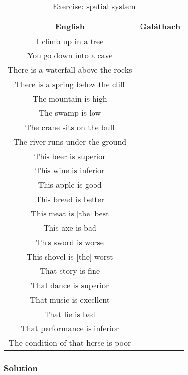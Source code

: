 \begin{table}[H]
\centering
\begin{tabular}{|c|M{5.0cm}|}
  \toprule
  \textbf{English} & \textbf{Gal\'{a}thach}\\
  \toprule
  I climb up in a tree & \\
  \midrule
  You go down into a cave & \\
  \midrule
  There is a waterfall above the rocks & \\
  \midrule
  There is a spring below the cliff & \\
  \midrule
  The mountain is high & \\
  \midrule
  The swamp is low & \\
  \midrule
  The crane sits on the bull & \\
  \midrule
  The river runs under the ground & \\
  \midrule
  This beer is superior & \\
  \midrule
  This wine is inferior & \\
  \midrule
  This apple is good & \\
  \midrule
  This bread is better & \\
  \midrule
  This meat is [the] best & \\
  \midrule
  This axe is bad & \\
  \midrule
  This sword is worse & \\
  \midrule
  This shovel is [the] worst & \\
  \midrule
  That story is fine & \\
  \midrule
  That dance is superior & \\
  \midrule
  That music is excellent & \\
  \midrule
  That lie is bad & \\
  \midrule
  That performance is inferior & \\
  \midrule
  The condition of that horse is poor & \\
  \bottomrule
\end{tabular}
\label{exercise_spatial_system}
\caption{Exercise: spatial system}
\end{table}

\newpage
\subsubsection{Solution}


